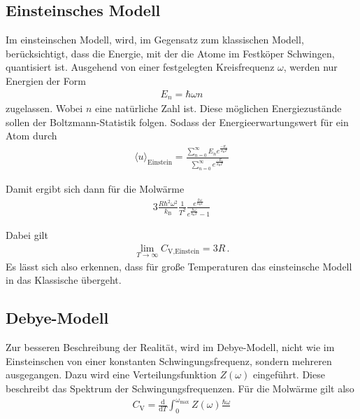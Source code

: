 \subsection{Einsteinsches Modell}
\label{subsec:einstein}
Im einsteinschen Modell, wird, im Gegensatz zum klassischen
Modell, berücksichtigt, dass die Energie, mit
der die Atome im Festköper Schwingen, quantisiert ist.
Ausgehend von einer festgelegten Kreisfrequenz $\omega$,
werden nur Energien der Form
\begin{align*}
	E_{n} = \hbar \omega n
\end{align*}
zugelassen. Wobei $n$ eine natürliche Zahl ist.
Diese möglichen Energiezustände sollen der Boltzmann-Statistik
folgen. Sodass der Energieerwartungswert für ein Atom durch
\begin{align}
	\langle u \rangle_{\text{Einstein}} = \frac{\sum^{\infty}_{n = 0}
	E_{n} e^{\frac{-E_{n}}{k_{\text{B}} T}}}{\sum^{\infty}_{n = 0}
	e^{\frac{-E_{n}}{k_{\text{B}} T}}} \label{eqn:5}
\end{align}

Damit ergibt sich dann für die Molwärme
\begin{align}
	3 \frac{R \hbar^{2} \omega^{2}}{k_{\text{B}}} \frac{1}{T^{2}}
	\frac{e^{\frac{\hbar \omega}{k_{\text{B}} T}}}{e^{\frac{\hbar \omega}{k_{\text{B}} T}} - 1}
\end{align}

Dabei gilt
\begin{align}
	\lim_{T \rightarrow \infty} C_{\text{V,Einstein}} = 3R \, .
\end{align}
Es lässt sich also erkennen, dass  für große Temperaturen
das einsteinsche Modell in das Klassische übergeht.

\subsection{Debye-Modell}
\label{subsec:debye}
Zur besseren Beschreibung der Realität, wird im Debye-Modell,
nicht wie im Einsteinschen von einer konstanten Schwingungsfrequenz,
sondern mehreren ausgegangen.
Dazu wird eine Verteilungsfunktion $Z(\omega)$ eingeführt.
Diese beschreibt das Spektrum der Schwingungsfrequenzen.
Für die Molwärme gilt also
\begin{align}
	C_{\text{V}} = \frac{\mathrm{d}}{\mathrm{d}T} \int_{0}^{\omega_{\text{max}}} Z(\omega) \frac{\hbar \omega}{}
\end{align}



\cite{sample}
